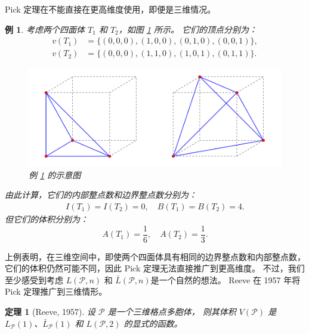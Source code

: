 \documentclass[12pt,a4paper]{ctexbook} %
\newcounter{theorem}[section]
\newtheorem{theoreminner}[theorem]{定理}
\newtheorem{example}[theorem]{例}
\numberwithin{figure}{section}
\theoremstyle{problemstyle}
\numberwithin{equation}{section} %
\begin{document}
Pick 定理在不能直接在更高维度使用，即便是三维情况。
\begin{example}\label{pick-conterex}
考虑两个四面体 \( T_1 \) 和 \( T_2 \)，如图 \ref{fig: pick-conterex} 所示。
它们的顶点分别为：
\begin{align*}
v(T_1) & = \{(0,0,0), (1,0,0), (0,1,0), (0,0,1)\},\\[6pt]
v(T_2) & = \{(0,0,0), (1,1,0), (1,0,1), (0,1,1)\}.
\end{align*}
\begin{figure}
    \centering
    \includegraphics[width=0.75\linewidth]{pick-high.png}
    \caption{例 \ref{pick-conterex} 的示意图}
    \label{fig: pick-conterex}
\end{figure}
由此计算，它们的内部整点数和边界整点数分别为：
\begin{align*}
    I(T_1) = I(T_2) = 0,\quad B(T_1) = B(T_2) = 4.
\end{align*}
但它们的体积分别为：
\[
A(T_1) = \frac{1}{6}, \quad A(T_2) = \frac{1}{3}.
\]
\end{example}

上例表明，在三维空间中，即使两个四面体具有相同的边界整点数和内部整点数，它们的体积仍然可能不同，因此 Pick 定理无法直接推广到更高维度。
不过，我们至少感受到考虑 $L(\mathcal{P},n)$ 和 $\bar{L}(\mathcal{P},n)$是一个自然的想法。
Reeve 在 1957 年将 Pick 定理推广到三维情形。

\begin{theoreminner}[Reeve, 1957]
设 \( \mathcal{P} \) 是一个三维格点多胞体，
则其体积 \( V(\mathcal{P}) \) 是 \( L_{\mathcal{P}}(1) \)、\( \bar{L}_\mathcal{P}(1) \) 和 \( L(\mathcal{P},2) \) 的显式的函数。
\end{theoreminner}
\end{document}
